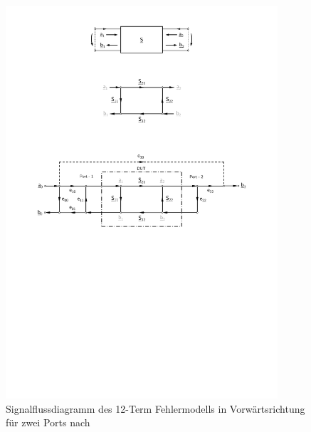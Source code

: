 \begin{figure}[ht]
    \centering
    \includegraphics[page = 1, trim = 2cm 12cm 2cm 10.3cm, clip, width = 0.9\textwidth]{Abbildungen/Kapitel4/Zweitor.pdf}
    \caption[Signalflussdiagramm des 12-Term Fehlermodells in Vorwärtsrichtung für zwei Ports]{Signalflussdiagramm des 12-Term Fehlermodells in Vorwärtsrichtung für zwei Ports nach~\cite{VNA_Error_Models_and_Calibration_Methods}}
    \label{fig:4_Fehlermodell}
\end{figure}

